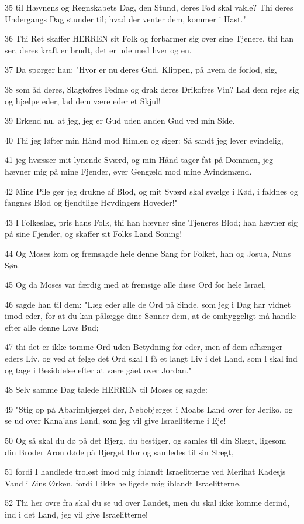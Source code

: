 \par 35 til Hævnens og Regnskabets Dag, den Stund, deres Fod skal vakle? Thi deres Undergangs Dag stunder til; hvad der venter dem, kommer i Hast."
\par 36 Thi Ret skaffer HERREN sit Folk og forbarmer sig over sine Tjenere, thi han ser, deres kraft er brudt, det er ude med hver og en.
\par 37 Da spørger han: "Hvor er nu deres Gud, Klippen, på hvem de forlod, sig,
\par 38 som åd deres, Slagtofres Fedme og drak deres Drikofres Vin? Lad dem rejse sig og hjælpe eder, lad dem være eder et Skjul!
\par 39 Erkend nu, at jeg, jeg er Gud uden anden Gud ved min Side.
\par 40 Thi jeg løfter min Hånd mod Himlen og siger: Så sandt jeg lever evindelig,
\par 41 jeg hvæsser mit lynende Sværd, og min Hånd tager fat på Dommen, jeg hævner mig på mine Fjender, øver Gengæld mod mine Avindsmænd.
\par 42 Mine Pile gør jeg drukne af Blod, og mit Sværd skal svælge i Kød, i faldnes og fangnes Blod og fjendtlige Høvdingers Hoveder!"
\par 43 I Folkeslag, pris hans Folk, thi han hævner sine Tjeneres Blod; han hævner sig på sine Fjender, og skaffer sit Folks Land Soning!
\par 44 Og Moses kom og fremsagde hele denne Sang for Folket, han og Josua, Nuns Søn.
\par 45 Og da Moses var færdig med at fremsige alle disse Ord for hele Israel,
\par 46 sagde han til dem: "Læg eder alle de Ord på Sinde, som jeg i Dag har vidnet imod eder, for at du kan pålægge dine Sønner dem, at de omhyggeligt må handle efter alle denne Lovs Bud;
\par 47 thi det er ikke tomme Ord uden Betydning for eder, men af dem afhænger eders Liv, og ved at følge det Ord skal I få et langt Liv i det Land, som l skal ind og tage i Besiddelse efter at være gået over Jordan."
\par 48 Selv samme Dag talede HERREN til Moses og sagde:
\par 49 "Stig op på Abarimbjerget der, Nebobjerget i Moabs Land over for Jeriko, og se ud over Kana'ans Land, som jeg vil give Israelitterne i Eje!
\par 50 Og så skal du dø på det Bjerg, du bestiger, og samles til din Slægt, ligesom din Broder Aron døde på Bjerget Hor og samledes til sin Slægt,
\par 51 fordi I handlede troløst imod mig iblandt Israelitterne ved Merihat Kadesjs Vand i Zins Ørken, fordi I ikke helligede mig iblandt Israelitterne.
\par 52 Thi her ovre fra skal du se ud over Landet, men du skal ikke komme derind, ind i det Land, jeg vil give Israelitterne!

